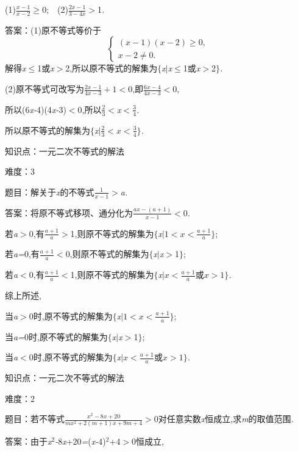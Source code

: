 \documentclass{article} %
\begin{document}
 (1)$\frac{x-1}{x-2}$$\mathrm{\ge}$0;\textit{　}(2)$\frac{2x-1}{3-4x}$\textit{$>$}1\textit{.}

 答案：(1)原不等式等价于
\[
\begin{cases}
(x-1)(x-2)\ge 0,\\
x-2 \ne 0.
\end{cases}
\]
解得\textit{x}$\mathrm{\le}$1或\textit{x$>$}2,所以原不等式的解集为$\mathrm{\{}$\textit{x$|$x}$\mathrm{\le}$1或\textit{x$>$}2$\mathrm{\}}$\textit{.}

(2)原不等式可改写为$\frac{2x-1}{4x-3}+1<0$,即$\frac{6x-4}{4x-3}<0$,

所以(6\textit{x-}4)(4\textit{x-}3)\textit{$<$}0,所以\textit{$\frac{2}{3}<$x$<\frac{3}{4}$}\textit{.}

所以原不等式的解集为$\mathrm{\{}$\textit{x$|\frac{2}{3}<x<\frac{3}{4}$}$\mathrm{\}}$\textit{.}

知识点：一元二次不等式的解法

难度：3

 题目：解关于\textit{x}的不等式$\frac{1}{x-1}$\textit{$>$a.}

 答案：将原不等式移项、通分化为$\frac{ax-(a+1)}{x-1}$\textit{$<$}0\textit{.}

若\textit{a$>$}0,有$\frac{a+1}{a}$\textit{$>$}1,则原不等式的解集为$\mathrm{\{}$\textit{x$|1<x<\frac{a+1}{a}$}$\mathrm{\}}$;

若\textit{a=}0,有$\frac{a+1}{a}$\textit{$<$}0,则原不等式的解集为$\mathrm{\{}$\textit{x$|$x$>$}1$\mathrm{\}}$;

若\textit{a$<$}0,有$\frac{a+1}{a}$\textit{$<$}1,则原不等式的解集为$\mathrm{\{}$\textit{x$|x<\frac{a+1}{a} \text{或} x>1$}$\mathrm{\}}$\textit{.}

综上所述,

当\textit{a$>$}0时,原不等式的解集为$\mathrm{\{}$\textit{x$|1<x<\frac{a+1}{a}$}$\mathrm{\}}$;

当\textit{a=}0时,原不等式的解集为$\mathrm{\{}$\textit{x$|$x$>$}1$\mathrm{\}}$;

当\textit{a$<$}0时,原不等式的解集为$\mathrm{\{}$\textit{x$|x<\frac{a+1}{a} \text{或} x>1$}$\mathrm{\}}$\textit{.}

知识点：一元二次不等式的解法

难度：2

 题目：若不等式$\frac{x^2-8x+20}{mx^2+2(m+1)x+9m+4}$\textit{$>$}0对任意实数\textit{x}恒成立,求\textit{m}的取值范围\textit{.}

 答案：由于\textit{x}${}^{2}$\textit{-}8\textit{x$+$}20\textit{=}(\textit{x-}4)${}^{2}$\textit{$+$}4\textit{$>$}0恒成立,
\end{document}
